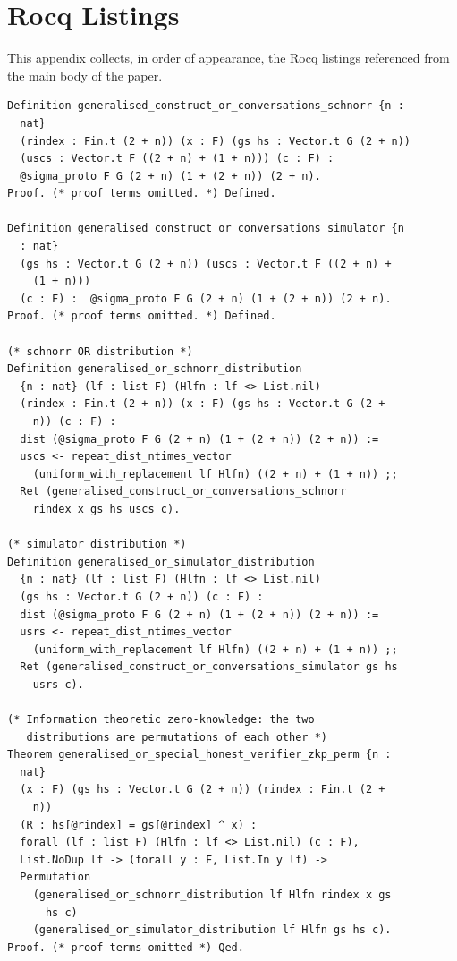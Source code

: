\section{Rocq Listings}\label{appendix_listings}
This appendix collects, in order of appearance, the Rocq listings referenced from the main body of the paper.

\begin{lstlisting}[frame=single, language=Coq, caption={Or-$\Sigma$-Protocol},
label={or_proof},captionpos=t, basicstyle=\ttfamily\scriptsize,
abovecaptionskip=-\medskipamount]
Definition generalised_construct_or_conversations_schnorr {n :
  nat} 
  (rindex : Fin.t (2 + n)) (x : F) (gs hs : Vector.t G (2 + n))
  (uscs : Vector.t F ((2 + n) + (1 + n))) (c : F) : 
  @sigma_proto F G (2 + n) (1 + (2 + n)) (2 + n).
Proof. (* proof terms omitted. *) Defined.

Definition generalised_construct_or_conversations_simulator {n
  : nat} 
  (gs hs : Vector.t G (2 + n)) (uscs : Vector.t F ((2 + n) +
    (1 + n)))  
  (c : F) :  @sigma_proto F G (2 + n) (1 + (2 + n)) (2 + n).
Proof. (* proof terms omitted. *) Defined.

(* schnorr OR distribution *)
Definition generalised_or_schnorr_distribution  
  {n : nat} (lf : list F) (Hlfn : lf <> List.nil) 
  (rindex : Fin.t (2 + n)) (x : F) (gs hs : Vector.t G (2 +
    n)) (c : F) : 
  dist (@sigma_proto F G (2 + n) (1 + (2 + n)) (2 + n)) := 
  uscs <- repeat_dist_ntimes_vector 
    (uniform_with_replacement lf Hlfn) ((2 + n) + (1 + n)) ;;
  Ret (generalised_construct_or_conversations_schnorr 
    rindex x gs hs uscs c).

(* simulator distribution *)
Definition generalised_or_simulator_distribution  
  {n : nat} (lf : list F) (Hlfn : lf <> List.nil) 
  (gs hs : Vector.t G (2 + n)) (c : F) : 
  dist (@sigma_proto F G (2 + n) (1 + (2 + n)) (2 + n)) :=
  usrs <- repeat_dist_ntimes_vector 
    (uniform_with_replacement lf Hlfn) ((2 + n) + (1 + n)) ;;
  Ret (generalised_construct_or_conversations_simulator gs hs
    usrs c).

(* Information theoretic zero-knowledge: the two 
   distributions are permutations of each other *)
Theorem generalised_or_special_honest_verifier_zkp_perm {n :
  nat} 
  (x : F) (gs hs : Vector.t G (2 + n)) (rindex : Fin.t (2 +
    n)) 
  (R : hs[@rindex] = gs[@rindex] ^ x) :
  forall (lf : list F) (Hlfn : lf <> List.nil) (c : F),
  List.NoDup lf -> (forall y : F, List.In y lf) ->
  Permutation 
    (generalised_or_schnorr_distribution lf Hlfn rindex x gs
      hs c)
    (generalised_or_simulator_distribution lf Hlfn gs hs c).
Proof. (* proof terms omitted *) Qed.
\end{lstlisting}

